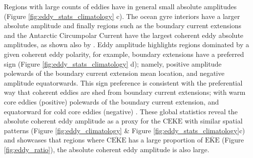 \documentclass[draft,linenumbers]{agujournal2019}
\newcommand{\MEKE}{\overline{\textrm{EKE}}}
\newcommand{\MCEKE}{\overline{\textrm{CEKE}}}
\newcommand{\CEKE}{\textrm{CEKE}}
\begin{document}
	Regions with large counts of eddies have in general small absolute amplitudes (Figure \ref{fig:eddy_stats_climatology} c).
	The ocean gyre interiors have a larger absolute amplitude and finally regions such as the boundary current extensions and the Antarctic Circumpolar Current have the largest coherent eddy absolute amplitudes, as shown also by \citet{Chelton_The_2011}.
	Eddy amplitude highlights regions dominated by a given coherent eddy polarity, for example, boundary extensions have a preferred sign (Figure \ref{fig:eddy_stats_climatology} d); namely, positive amplitude polewards of the boundary current extension mean location, and negative amplitude equatorwards. 
	This sign preference is consistent with the preferential way that coherent eddies are shed from boundary current extensions; with warm core eddies (positive)  polewards of the boundary current extension, and equatorward for cold core eddies (negative) \citep{Chelton_Global_2007,Chelton_The_2011,Kang_eddy_characteristics_2013}. 
	These global statistics reveal the absolute coherent eddy amplitude as a proxy for the $\CEKE$ with similar spatial patterns (Figure \ref{fig:eddy_climatology} \& Figure \ref{fig:eddy_stats_climatology}c) and showcases that regions where $\MCEKE$ has a large proportion of $\MEKE$ (Figure \ref{fig:eddy_ratio}), the absolute coherent eddy amplitude is also large.


\end{document}
